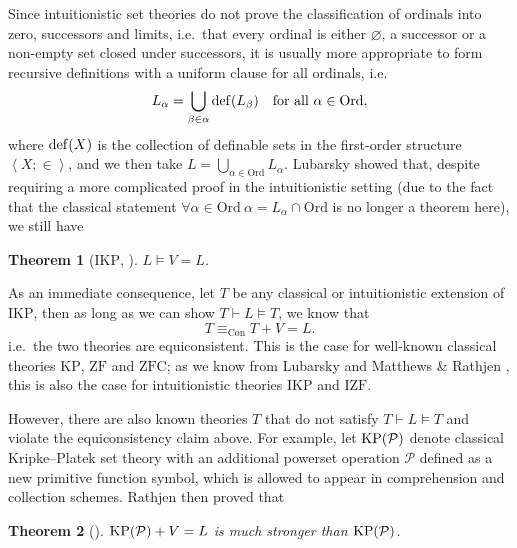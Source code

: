 \documentclass[preprint]{elsarticle}
\theoremstyle{plain}
\newtheorem{theorem}{Theorem}
\newcommand{\tuple}[1]{\left\langle #1 \right\rangle}
\newcommand{\Ord}{\mathrm{Ord}}
\DeclareMathOperator{\dd}{def}
\begin{document}
Since intuitionistic set theories do not prove the classification of ordinals into zero, successors and limits, i.e.\ that every ordinal is either $\varnothing$, a successor or a non-empty set closed under successors, it is usually more appropriate to form recursive definitions with a uniform clause for all ordinals, i.e.
\[L_\alpha = \bigcup_{\beta \in \alpha} \dd\mleft(L_\beta\mright) \quad \text{for all $\alpha \in \Ord$},\]
where $\dd\mleft(X\mright)$ is the collection of definable sets in the first-order structure $\tuple{X; \in}$, and we then take $L = \bigcup_{\alpha \in \Ord} L_\alpha$. Lubarsky showed that, despite requiring a more complicated proof in the intuitionistic setting (due to the fact that the classical statement $\forall \alpha \in \Ord \ \alpha = L_\alpha \cap \Ord$ is no longer a theorem here), we still have
\begin{theorem}[$\mathrm{IKP}$, \cite{lubarsky93-intuitionistic-l,matthews-rathjen24-constructible-universe}]
  $L \vDash V = L$.
\end{theorem}

As an immediate consequence, let $T$ be any classical or intuitionistic extension of $\mathrm{IKP}$, then as long as we can show $T \vdash L \vDash T$, we know that
\[T \equiv_{\mathrm{Con}} T + V = L.\]
i.e.\ the two theories are equiconsistent. This is the case for well-known classical theories $\mathrm{KP}$, $\mathrm{ZF}$ and $\mathrm{ZFC}$; as we know from Lubarsky \cite{lubarsky93-intuitionistic-l} and Matthews \& Rathjen \cite{matthews-rathjen24-constructible-universe}, this is also the case for intuitionistic theories $\mathrm{IKP}$ and $\mathrm{IZF}$.

However, there are also known theories $T$ that do not satisfy $T \vdash L \vDash T$ and violate the equiconsistency claim above. For example, let $\mathrm{KP}\mleft(\mathcal{P}\mright)$ denote classical Kripke--Platek set theory with an additional powerset operation $\mathcal{P}$ defined as a new primitive function symbol, which is allowed to appear in comprehension and collection schemes. Rathjen \cite{rathjen20-power-kp-choice} then proved that
\begin{theorem}[{\cite[Theorem 4.6]{rathjen20-power-kp-choice}}]
  $\mathrm{KP}\mleft(\mathcal{P}\mright) + V = L$ is much stronger than $\mathrm{KP}\mleft(\mathcal{P}\mright)$.
\end{theorem}
\end{document}
